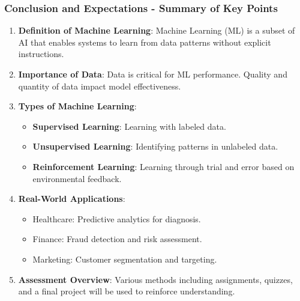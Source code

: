 \documentclass[aspectratio=169]{beamer}
\begin{document}
\begin{frame}[fragile]
  \frametitle{Conclusion and Expectations - Summary of Key Points}
  \begin{enumerate}
    \item \textbf{Definition of Machine Learning}: 
      Machine Learning (ML) is a subset of AI that enables systems to learn from data patterns without explicit instructions.

    \item \textbf{Importance of Data}: 
      Data is critical for ML performance. Quality and quantity of data impact model effectiveness.

    \item \textbf{Types of Machine Learning}:
      \begin{itemize}
        \item \textbf{Supervised Learning}: Learning with labeled data.
        \item \textbf{Unsupervised Learning}: Identifying patterns in unlabeled data.
        \item \textbf{Reinforcement Learning}: Learning through trial and error based on environmental feedback.
      \end{itemize}

    \item \textbf{Real-World Applications}:
      \begin{itemize}
        \item Healthcare: Predictive analytics for diagnosis.
        \item Finance: Fraud detection and risk assessment.
        \item Marketing: Customer segmentation and targeting.
      \end{itemize}

    \item \textbf{Assessment Overview}:
      Various methods including assignments, quizzes, and a final project will be used to reinforce understanding.
  \end{enumerate}
\end{frame}
\end{document}
